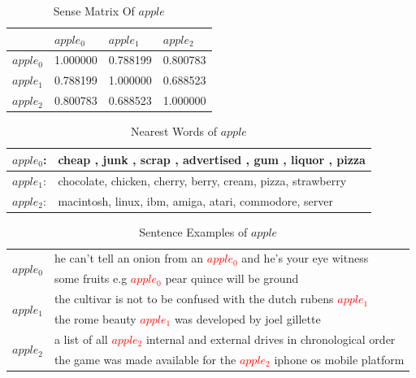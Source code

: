 \begin{table}[H]

\begin{center} \begin{tabular}{|l|l|l|l|}  
\hline
& $apple_0$ & $apple_1$ & $apple_2$ \\ 
\hline  
$apple_0$  & 1.000000  & 0.788199 & 0.800783 \\ 
\hline 
$apple_1$  & 0.788199 & 1.000000 & 0.688523  \\ 
\hline 
$apple_2$  & 0.800783 & 0.688523 & 1.000000  \\
\hline
\end{tabular} 
\caption{Sense Matrix Of $apple$} \label{tab:sensematrixapple} 
\end{center}
\end{table}
 
 

\begin{table}[H]

\begin{center} \begin{tabular}{|l|l|}  
\hline 
$apple_0$: & cheap , junk , scrap , advertised , gum , liquor , pizza   \\  
\hline
$apple_1$: & chocolate, chicken, cherry, berry, cream, pizza, strawberry  \\  
\hline
$apple_2$: & macintosh, linux, ibm, amiga, atari, commodore, server   \\  
\hline
\end{tabular}
\caption{Nearest Words of $apple$} \label{tab:nearestapple} 
\end{center}
\end{table}


\begin{table}[H]

\begin{center} 
\begin{tabular}{|l|l|}
\hline
\multirow{2}{*}{$apple_0$} 
&he can't tell an onion from an \textcolor{red}{$apple_0$} and he's your eye witness\\
&some fruits e.g \textcolor{red}{$apple_0$} pear quince will be ground\\
\hline
\multirow{2}{*}{$apple_1$} 
&the cultivar is not to be confused with the dutch rubens \textcolor{red}{$apple_1$}\\
&the rome beauty \textcolor{red}{$apple_1$} was developed by joel gillette \\
\hline
\multirow{2}{*}{$apple_2$} 
&a list of all \textcolor{red}{$apple_2$} internal and external drives in chronological order\\
&the game was made available for the \textcolor{red}{$apple_2$} iphone os mobile platform\\
\hline
\end{tabular} 
\caption{Sentence Examples of $apple$} \label{tab:sentenceapple} 
\end{center}
\end{table}


